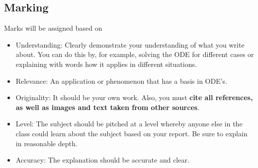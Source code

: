 \subsection{Marking}
Marks will be assigned based on
\begin{itemize}
    \item Understanding: Clearly demonstrate your understanding of what you write about. You can do this by, for example, solving the ODE for different cases or explaining with words how it applies in different situations.
    \item Relevance: An application or phenomenon that has a basis in ODE's.
    \item Originality: It should be your own work. Also, you must \textbf{cite all references, as well as images and text taken from other sources}.
    \item Level: The subject should be pitched at a level whereby anyone else in the class could learn about the subject based on your report. Be sure to explain in reasonable depth.
    \item Accuracy: The explanation should be accurate and clear.
\end{itemize}

